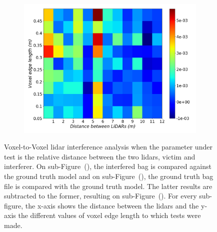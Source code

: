 \begin{figure}[!ht]
\begin{subfigure}[c]{0.45\textwidth}
	\label{fig:distance:octree-ground-truth-color-mesh}
\end{subfigure}
\\ \vspace{4mm}
\begin{subfigure}[c]{0.6\textwidth}
	\includegraphics[width=\textwidth]{img/lidar-interference/distance/octree_difference_color_mesh.png}
	\caption{}%
	\label{fig:distance:octree-difference-color-mesh}
\end{subfigure}

\caption[Voxel-to-Voxel analysis when the distance between the \acp{lidar} is variated.]{Voxel-to-Voxel \ac{lidar} interference analysis when the parameter under test is the relative distance between the two \acp{lidar}, victim and interferer. On sub-Figure~(), the interfered bag is compared against the ground truth model and on sub-Figure~(), the ground truth bag file is compared with the ground truth model. The latter results are subtracted to the former, resulting on sub-Figure~(). For every sub-figure, the x-axis shows the distance between the \acp{lidar} and the y-axis the different values of voxel edge length to which tests were made.}
\label{fig:distance:octree-color-mesh}
\end{figure}

